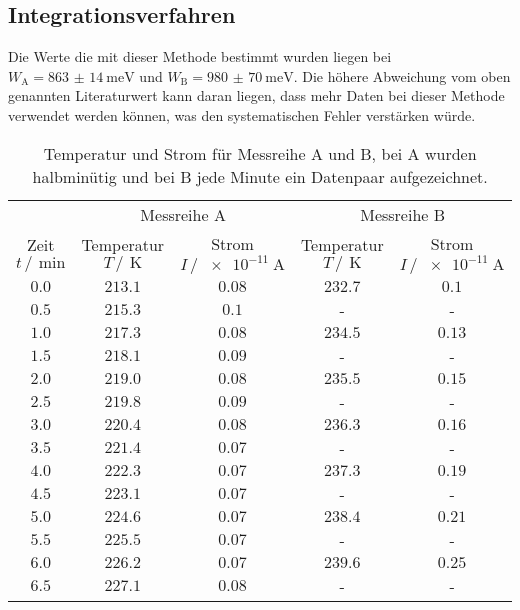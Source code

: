 \subsection{Integrationsverfahren}
Die Werte die mit dieser Methode bestimmt wurden liegen bei $W_{\text{A}}=\SI{863(14)}{\milli\eV}$ und $W_{\text{B}}=\SI{980(70)}{\milli\eV}$.
Die höhere Abweichung vom oben genannten Literaturwert kann daran liegen, dass mehr Daten bei dieser Methode verwendet werden können, was den systematischen 
Fehler verstärken würde. 
\newpage
\begin{table}
    \centering
    \caption{Temperatur und Strom für Messreihe A und B, bei A wurden halbminütig und bei B jede Minute ein Datenpaar aufgezeichnet.}
    \label{tab:Messdaten_roh}
    \begin{tabular}{c c c c c}
        \toprule
        &\multicolumn{2}{c}{Messreihe A}&\multicolumn{2}{c}{Messreihe B}\\
        Zeit $t \,/\,\SI{}{\minute}$&Temperatur $T \,/\,\SI{}{\kelvin}$ &Strom $I \,/\,\SI{e-11}{\ampere}$&Temperatur $T \,/\,\SI{}{\kelvin}$ &Strom $I \,/\,\SI{e-11}{\ampere}$\\
        \midrule
        $\num{0.0}$&$\num{213.1}$&$\num{0.08}$&$\num{232.7}$&$\num{0.1}$\\
        $\num{0.5}$&$\num{215.3}$&$\num{0.1}$&-&-\\
        $\num{1.0}$&$\num{217.3}$&$\num{0.08}$&$\num{234.5}$&$\num{0.13}$\\
        $\num{1.5}$&$\num{218.1}$&$\num{0.09}$&-&-\\
        $\num{2.0}$&$\num{219.0}$&$\num{0.08}$&$\num{235.5}$&$\num{0.15}$\\
        $\num{2.5}$&$\num{219.8}$&$\num{0.09}$&-&-\\
        $\num{3.0}$&$\num{220.4}$&$\num{0.08}$&$\num{236.3}$&$\num{0.16}$\\
        $\num{3.5}$&$\num{221.4}$&$\num{0.07}$&-&-\\
        $\num{4.0}$&$\num{222.3}$&$\num{0.07}$&$\num{237.3}$&$\num{0.19}$\\
        $\num{4.5}$&$\num{223.1}$&$\num{0.07}$&-&-\\
        $\num{5.0}$&$\num{224.6}$&$\num{0.07}$&$\num{238.4}$&$\num{0.21}$\\
        $\num{5.5}$&$\num{225.5}$&$\num{0.07}$&-&-\\
        $\num{6.0}$&$\num{226.2}$&$\num{0.07}$&$\num{239.6}$&$\num{0.25}$\\
        $\num{6.5}$&$\num{227.1}$&$\num{0.08}$&-&-\\

\end{tabular}
\end{table}
